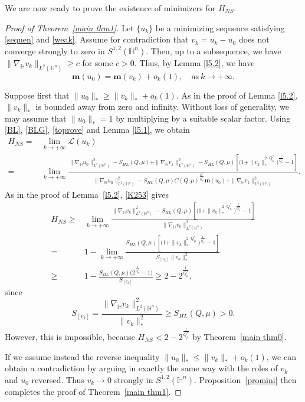 \documentclass[11pt]{article}
\begin{document}
We are now ready to prove the existence of minimizers for $H_{NS}$.
\begin{proof}
[Proof of Theorem~\ref{main thm1}]
{Let $\{u_k\}$ be a minimizing sequence satisfying \eqref{sequen} and \eqref{weak}. Assume for contradiction that} $v_k=u_k-u_0$ does not converge strongly to zero in $S^{1,2}(\mathbb{H}^{n})$. Then, up to a subsequence, we have $\|\nabla_\mathbb{H} v_k\|_{L^2(\mathbb{H}^n)}\geq c$ for some $c>0$. Thus, by Lemma \ref{l5.2}, we have
\begin{equation}\label{toprove}
 \mathbf{m}(u_0) =\mathbf{m}(v_k)+o_k(1),\quad \mathrm{as} ~k\rightarrow+\infty.
\end{equation}

Suppose first that $\|u_0\|_*\geq\|v_k\|_*+o_k(1)$. As in the proof of Lemma \ref{l5.2}, $\|v_k\|_*$ is bounded away from zero and infinity.
Without loss of generality,
we may assume that $\|u_0\|_*=1$ by multiplying by a suitable scalar factor. Using
\eqref{BL}, \eqref{BLG}, \eqref{toprove} and Lemma \ref{l5.1}, we obtain
\begin{align*}
 H_{NS}=&\lim\limits_{k\rightarrow+\infty}\mathcal{L}(u_k)\\
 =&
\lim\limits_{k\rightarrow+\infty}\frac{\|\nabla_\mathbb{H} u_0\|_{L^2(\mathbb{H}^n)}^2-S_{HL}(Q,\mu)+\|\nabla_\mathbb{H} v_k\|_{L^2(\mathbb{H}^n)}^2-S_{HL}(Q,\mu) \left[\Big(1+\|v_k\|_*^{2\cdot Q^{\ast}_{\mu}}\Big)^{\frac{1}{Q^{\ast}_{\mu}}}-1\right]}
{\|\nabla_\mathbb{H} u_0\|_{L^2(\mathbb{H}^n)}^2-S_{HL}(Q,\mu)C(Q,\mu)^{\frac{Q^{\ast}}{Q^{\ast}_{\mu}}}\mathbf{m}(u_0)+
\|\nabla_\mathbb{H} v_k\|_{L^2(\mathbb{H}^n)}^2}.
\end{align*}
{As in the proof of Lemma~\ref{l5.2}, \eqref{K253} gives}
\begin{align*}
 H_{NS}\geq& \lim\limits_{k\rightarrow+\infty}\frac{\|\nabla_\mathbb{H} v_k\|_{L^2(\mathbb{H}^n)}^2-S_{HL}(Q,\mu) \left[\Big(1+\|v_k\|_*^{2\cdot Q^{\ast}_{\mu}}\Big)^{\frac{1}{Q^{\ast}_{\mu}}}-1\right]}
{
\|\nabla_\mathbb{H} v_k\|_{L^2(\mathbb{H}^n)}^2}\\
=&1-\lim\limits_{k\rightarrow+\infty}\frac{S_{HL}(Q,\mu) \left[\Big(1+\|v_k\|_*^{2\cdot Q^{\ast}_{\mu}}\Big)^{\frac{1}{Q^{\ast}_{\mu}}}-1\right]}
{
S_{[v_{k}]}\|v_{k}\|_*^2}\\
\geq& 1-\frac{S_{HL}(Q,\mu) \Big(2^{\frac{1}{Q^{\ast}_{\mu}}}-1\Big)}
{
S_{[v_{k}]}}\geq 2-2^{\frac{1}{Q^{\ast}_{\mu}}},
\end{align*}
since
 \begin{equation*}
 S_{[v_{k}]}=\frac{\|\nabla_\mathbb{H} v_{k}\|_{L^2(\mathbb{H}^n)}^2}{\|v_{k}\|_*^2}\geq S_{HL}(Q,\mu)>0.
 \end{equation*}
However, this is impossible, because $H_{NS}<2-2^{\frac{1}{Q^{\ast}_{\mu}}}$ by Theorem~\ref{main thm0}.

If we assume instead the reverse inequality $\|u_0\|_*\leq\|v_k\|_*+o_k(1)$, we can obtain a contradiction by arguing in exactly the same way with the roles of $v_k$ and $u_0$ reversed.
{Thus $v_k\to0$ strongly in $S^{1,2}(\mathbb H^n)$. Proposition~\ref{promini} then completes the proof of Theorem~\ref{main thm1}.}
\end{proof}
\end{document}
